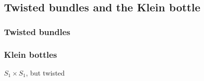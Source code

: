 
\subsection{Twisted bundles and the Klein bottle}

\subsubsection{Twisted bundles}

\subsubsection{Klein bottles}

\(S_1 \times S_1\), but twisted

